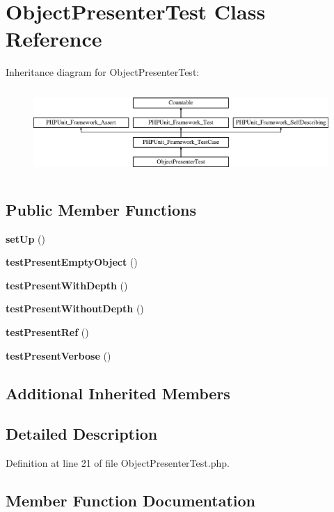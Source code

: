 \section{Object\+Presenter\+Test Class Reference}
\label{class_psy_1_1_test_1_1_presenter_1_1_object_presenter_test}
Inheritance diagram for Object\+Presenter\+Test\+:\begin{figure}[H]
\begin{center}
\leavevmode
\includegraphics[height=3.303835cm]{class_psy_1_1_test_1_1_presenter_1_1_object_presenter_test}
\end{center}
\end{figure}
\subsection*{Public Member Functions}
\begin{DoxyCompactItemize}
\item 
{\bf set\+Up} ()
\item 
{\bf test\+Present\+Empty\+Object} ()
\item 
{\bf test\+Present\+With\+Depth} ()
\item 
{\bf test\+Present\+Without\+Depth} ()
\item 
{\bf test\+Present\+Ref} ()
\item 
{\bf test\+Present\+Verbose} ()
\end{DoxyCompactItemize}
\subsection*{Additional Inherited Members}


\subsection{Detailed Description}


Definition at line 21 of file Object\+Presenter\+Test.\+php.



\subsection{Member Function Documentation}
